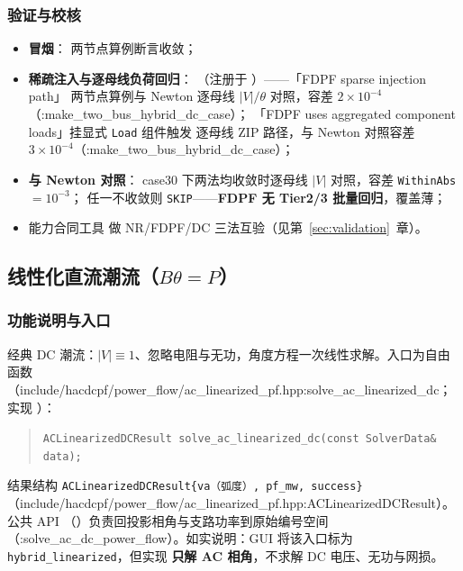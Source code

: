 \subsubsection*{验证与校核}
\begin{itemize}
  \item \textbf{冒烟}： 两节点算例断言收敛；
  \item \textbf{稀疏注入与逐母线负荷回归}：
        （注册于 ）——「FDPF sparse injection path」
        两节点算例与 Newton 逐母线 $|V|/\theta$ 对照，容差 $2\times10^{-4}$（:make\_two\_bus\_hybrid\_dc\_case）；
        「FDPF uses aggregated component loads」挂显式 \texttt{Load} 组件触发
         逐母线 ZIP 路径，与 Newton 对照容差
        $3\times10^{-4}$（:make\_two\_bus\_hybrid\_dc\_case）；
  \item \textbf{与 Newton 对照}：
        case30 下两法均收敛时逐母线 $|V|$ 对照，容差 \texttt{WithinAbs}$=10^{-3}$；
        任一不收敛则 \texttt{SKIP}——\textbf{FDPF 无 Tier2/3 批量回归}，覆盖薄；
  \item 能力合同工具  做
        NR/FDPF/DC 三法互验（见第~\ref{sec:validation}~章）。
\end{itemize}

\subsection{线性化直流潮流（$B\theta=P$）}


\subsubsection*{功能说明与入口}
经典 DC 潮流：$|V|\equiv1$、忽略电阻与无功，角度方程一次线性求解。入口为自由函数
（include/hacdcpf/power\_flow/ac\_linearized\_pf.hpp:solve\_ac\_linearized\_dc；实现 ）：
\begin{quote}\footnotesize
\texttt{ACLinearizedDCResult solve\_ac\_linearized\_dc(const SolverData\& data);}
\end{quote}
结果结构 \texttt{ACLinearizedDCResult\{va（弧度）, pf\_mw, success\}}
（include/hacdcpf/power\_flow/ac\_linearized\_pf.hpp:ACLinearizedDCResult）。公共 API 
（）负责回投影相角与支路功率到原始编号空间
（:solve\_ac\_dc\_power\_flow）。如实说明：GUI 将该入口标为 \texttt{hybrid\_linearized}，但实现
\textbf{只解 AC 相角}，不求解 DC 电压、无功与网损。

